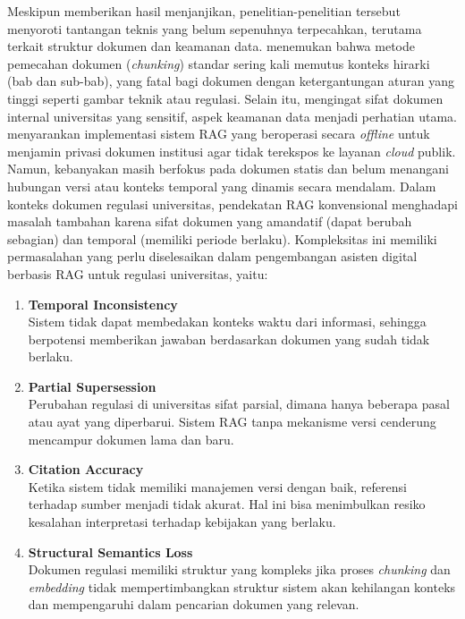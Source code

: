  Meskipun memberikan hasil menjanjikan, penelitian-penelitian tersebut menyoroti tantangan teknis yang belum sepenuhnya terpecahkan, terutama terkait struktur dokumen dan keamanan data. \cite{Steininger2025} menemukan bahwa metode pemecahan dokumen (\textit{chunking}) standar sering kali memutus konteks hirarki (bab dan sub-bab), yang fatal bagi dokumen dengan ketergantungan aturan yang tinggi seperti gambar teknik atau regulasi. 
 Selain itu, mengingat sifat dokumen internal universitas yang sensitif, aspek keamanan data menjadi perhatian utama. \cite{Anjaneyulu2025} menyarankan implementasi sistem RAG yang beroperasi secara \textit{offline} untuk menjamin privasi dokumen institusi agar tidak terekspos ke layanan \textit{cloud} publik. Namun, kebanyakan masih berfokus pada dokumen statis dan belum menangani hubungan versi atau konteks temporal yang dinamis secara mendalam. 
 Dalam konteks dokumen regulasi universitas, pendekatan RAG konvensional menghadapi masalah tambahan karena sifat dokumen yang amandatif (dapat berubah sebagian) dan temporal (memiliki periode berlaku). 
 Kompleksitas ini memiliki permasalahan yang perlu diselesaikan dalam pengembangan asisten digital berbasis RAG untuk regulasi universitas, yaitu:

\begin{enumerate}
    \item \textbf{Temporal Inconsistency} \\
    Sistem tidak dapat membedakan konteks waktu dari informasi, sehingga berpotensi memberikan jawaban berdasarkan dokumen yang sudah tidak berlaku.

    \item \textbf{Partial Supersession} \\
    Perubahan regulasi di universitas sifat parsial, dimana hanya beberapa pasal atau ayat yang diperbarui. Sistem RAG tanpa mekanisme versi cenderung mencampur dokumen lama dan baru.

    \item \textbf{Citation Accuracy} \\
    Ketika sistem tidak memiliki manajemen versi dengan baik, referensi terhadap sumber menjadi tidak akurat. Hal ini bisa menimbulkan resiko kesalahan interpretasi terhadap kebijakan yang berlaku.

    \item \textbf{Structural Semantics Loss} \\
    Dokumen regulasi memiliki struktur yang kompleks jika proses \textit{chunking} dan \textit{embedding} tidak mempertimbangkan struktur sistem akan kehilangan konteks dan mempengaruhi dalam pencarian dokumen yang relevan.
\end{enumerate}

